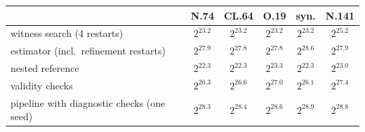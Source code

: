\begin{tabular}{lccccc}
\toprule
 & N.74 & CL.64 & O.19 & syn. & N.141 \\
\midrule
witness search (4 restarts) & $2^{23.2}$ & $2^{23.2}$ & $2^{23.2}$ & $2^{23.2}$ & $2^{25.2}$ \\
estimator (incl.\ refinement restarts) & $2^{27.9}$ & $2^{27.8}$ & $2^{27.8}$ & $2^{28.6}$ & $2^{27.9}$ \\
nested reference & $2^{22.3}$ & $2^{22.3}$ & $2^{23.3}$ & $2^{22.3}$ & $2^{23.0}$ \\
validity checks & $2^{26.3}$ & $2^{26.6}$ & $2^{27.0}$ & $2^{26.1}$ & $2^{27.4}$ \\
pipeline with diagnostic checks (one seed) & $2^{28.3}$ & $2^{28.4}$ & $2^{28.6}$ & $2^{28.9}$ & $2^{28.8}$ \\
\bottomrule
\end{tabular}
